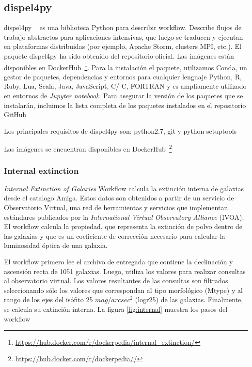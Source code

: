 


\subsection{dispel4py}

dispel4py ~\cite{} es una biblioteca Python para describir workflow. Describe flujos de trabajo abstractos para aplicaciones intensivas, que luego se traducen y ejecutan en plataformas distribuidas (por ejemplo, Apache Storm, clusters MPI, etc.).
El paquete dispel4py ha sido obtenido del repositorio oficial. Las imágenes están disponibles en DockerHub~\footnote{\url{https://hub.docker.com/r/dockerpedia/internal_extinction/}}. Para la instalación el paquete, utilizamos Conda, un gestor de paquetes, dependencias y entornos para cualquier lenguaje Python, R, Ruby,
Lua, Scala, Java, JavaScript, C/ C\+\+, FORTRAN y es ampliamente utilizado en entornos de \textit{Jupyter notebook}. Para asegurar la versión de los paquetes que se instalarán, incluimos la lista completa de los paquetes instalados en el repositorio GitHub


Los principales requisitos de dispel4py son: python2.7, git y  python-setuptools


Las imágenes se encuentran disponibles en DockerHub~\footnote{\url{https://hub.docker.com/r/dockerpedia//}}



\subsubsection{Internal extinction}

\textit{Internal Extinction of Galaxies} Workflow calcula la extinción interna de galaxias desde el catalogo Amiga. Estos datos son obtenidos a partir de un servicio de Observatorio Virtual, una red de herramientas y servicios que implementan estándares publicados por la \textit{International Virtual Observatory Alliance} (IVOA). El workflow calcula la propiedad, que representa la extinción de polvo dentro de las galaxias y que es un coeficiente de corrección necesario para calcular la luminosidad óptica de una galaxia.

El workflow primero lee el archivo de entregada que contiene la declinación y ascensión recta de 1051 galaxias. Luego, utiliza los valores para realizar consultas al observatorio virtual. Los valores resultantes de las consultas son filtrados seleccionando sólo los valores que correspondan al tipo morfológico (Mtype) y al rango de los ejes del isófito 25 $mag/arcsec^{2}$ (logr25) de las galaxias. Finalmente, se calcula su extinción interna. La figura \ref{fig:internal} muestra los pasos del workflow

